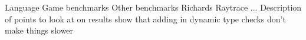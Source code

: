 \begin{outline}

\1 Language Game benchmarks
\1 Other benchmarks
    \2 Richards
    \2 Raytrace
    \2 ...
\1 Description of points to look at on results
    \2 show that adding in dynamic type checks don't make things slower


\end{outline}